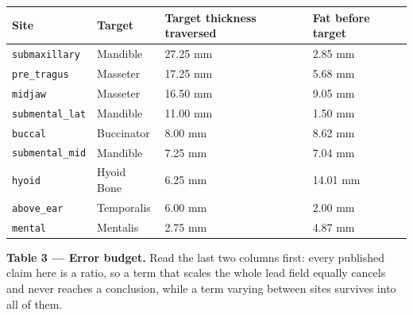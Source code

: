 \documentclass[
  11pt,
  letterpaper,
]{article}
\newcounter{none} %
\begin{document}
{\def\LTcaptype{none} %
\begin{longtable}[]{@{}llll@{}}
\toprule\noalign{}
Site & Target & Target thickness traversed & Fat before target \\
\midrule\noalign{}
\endhead
\bottomrule\noalign{}
\endlastfoot
\texttt{submaxillary} & Mandible & 27.25 mm & 2.85 mm \\
\texttt{pre\_tragus} & Masseter & 17.25 mm & 5.68 mm \\
\texttt{midjaw} & Masseter & 16.50 mm & 9.05 mm \\
\texttt{submental\_lat} & Mandible & 11.00 mm & 1.50 mm \\
\texttt{buccal} & Buccinator & 8.00 mm & 8.62 mm \\
\texttt{submental\_mid} & Mandible & 7.25 mm & 7.04 mm \\
\texttt{hyoid} & Hyoid Bone & 6.25 mm & 14.01 mm \\
\texttt{above\_ear} & Temporalis & 6.00 mm & 2.00 mm \\
\texttt{mental} & Mentalis & 2.75 mm & 4.87 mm \\
\end{longtable}
}

\textbf{Table 3 --- Error budget.} Read the last two columns first: every published
claim here is a ratio, so a term that scales the whole lead field equally
cancels and never reaches a conclusion, while a term varying between sites
survives into all of them.
\end{document}
